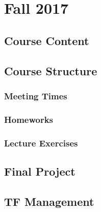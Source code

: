 \documentclass[11pt]{article}
\begin{document}
  \section{Fall 2017}
    \subsection{Course Content}
    \subsection{Course Structure}
      \subsubsection{Meeting Times}
      \subsubsection{Homeworks}
      \subsubsection{Lecture Exercises}
    \subsection{Final Project}
    \subsection{TF Management}
\end{document}
